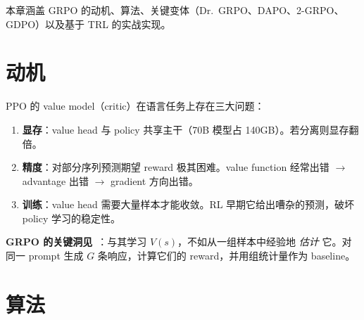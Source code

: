 本章涵盖 GRPO 的动机、算法、关键变体（Dr.~GRPO、DAPO、2-GRPO、GDPO）以及基于 TRL 的实战实现。

\section{动机}
\label{motivation-dup2}

PPO 的 value model（critic）在语言任务上存在三大问题：

\begin{enumerate}
  \item \textbf{显存}：value head 与 policy 共享主干（70B 模型占 140GB）。若分离则显存翻倍。
  \item \textbf{精度}：对部分序列预测期望 reward 极其困难。value function 经常出错 $\rightarrow$ advantage 出错 $\rightarrow$ gradient 方向出错。
  \item \textbf{训练}：value head 需要大量样本才能收敛。RL 早期它给出嘈杂的预测，破坏 policy 学习的稳定性。
\end{enumerate}

\textbf{GRPO 的关键洞见}~\cite{shao2024deepseekmath}：与其学习 $V(s)$，不如从一组样本中经验地 \emph{估计} 它。对同一 prompt 生成 $G$ 条响应，计算它们的 reward，并用组统计量作为 baseline。

\section{算法}
\label{algorithm}
\label{the-grpo-algorithm}

